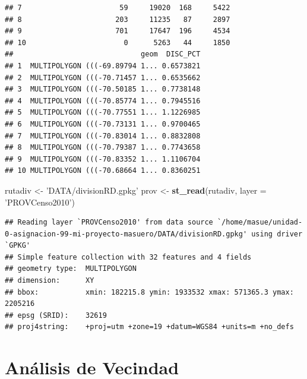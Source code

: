 \documentclass[11pt,]{article}
\newenvironment{Shaded}{\begin{snugshade}}{\end{snugshade}}
\newcommand{\KeywordTok}[1]{\textcolor[rgb]{0.13,0.29,0.53}{\textbf{#1}}}
\newcommand{\DataTypeTok}[1]{\textcolor[rgb]{0.13,0.29,0.53}{#1}}
\newcommand{\StringTok}[1]{\textcolor[rgb]{0.31,0.60,0.02}{#1}}
\newcommand{\OtherTok}[1]{\textcolor[rgb]{0.56,0.35,0.01}{#1}}
\newcommand{\OperatorTok}[1]{\textcolor[rgb]{0.81,0.36,0.00}{\textbf{#1}}}
\newcommand{\NormalTok}[1]{#1}
\begin{document}
\begin{verbatim}
## 7                       59     19020  168     5422
## 8                      203     11235   87     2897
## 9                      701     17647  196     4534
## 10                       0      5263   44     1850
##                              geom  DISC_PCT
## 1  MULTIPOLYGON (((-69.89794 1... 0.6573821
## 2  MULTIPOLYGON (((-70.71457 1... 0.6535662
## 3  MULTIPOLYGON (((-70.50185 1... 0.7738148
## 4  MULTIPOLYGON (((-70.85774 1... 0.7945516
## 5  MULTIPOLYGON (((-70.77551 1... 1.1226985
## 6  MULTIPOLYGON (((-70.73131 1... 0.9700465
## 7  MULTIPOLYGON (((-70.83014 1... 0.8832808
## 8  MULTIPOLYGON (((-70.79387 1... 0.7743658
## 9  MULTIPOLYGON (((-70.83352 1... 1.1106704
## 10 MULTIPOLYGON (((-70.68664 1... 0.8360251
\end{verbatim}

\begin{Shaded}
\begin{Highlighting}[]
\NormalTok{rutadiv <-}\StringTok{ 'DATA/divisionRD.gpkg'}
\NormalTok{prov <-}\StringTok{ }\KeywordTok{st_read}\NormalTok{(rutadiv, }\DataTypeTok{layer =} \StringTok{'PROVCenso2010'}\NormalTok{)}
\end{Highlighting}
\end{Shaded}

\begin{verbatim}
## Reading layer `PROVCenso2010' from data source `/home/masue/unidad-0-asignacion-99-mi-proyecto-masuero/DATA/divisionRD.gpkg' using driver `GPKG'
## Simple feature collection with 32 features and 4 fields
## geometry type:  MULTIPOLYGON
## dimension:      XY
## bbox:           xmin: 182215.8 ymin: 1933532 xmax: 571365.3 ymax: 2205216
## epsg (SRID):    32619
## proj4string:    +proj=utm +zone=19 +datum=WGS84 +units=m +no_defs
\end{verbatim}

\section{Análisis de Vecindad}\label{anuxe1lisis-de-vecindad}

\begin{Shaded}
\end{Shaded}
\end{document}

